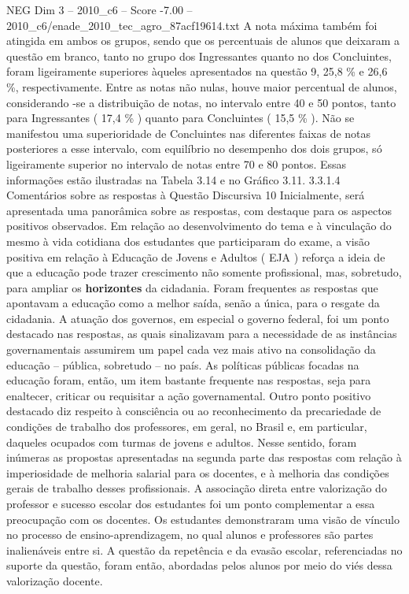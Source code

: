 \begin{textsample}{NEG Dim 3 – 2010\_c6 – Score -7.00 – 2010\_c6/enade\_2010\_tec\_agro\_87acf19614.txt}
A nota máxima também foi atingida em ambos os grupos, sendo que os percentuais de alunos que deixaram a questão em branco, tanto no grupo dos Ingressantes quanto no dos Concluintes, foram ligeiramente superiores àqueles apresentados na questão 9, 25,8 \% e 26,6 \%, respectivamente.
Entre as notas não nulas, houve maior percentual de alunos, considerando -se a distribuição de notas, no intervalo entre 40 e 50 pontos, tanto para Ingressantes ( 17,4 \% ) quanto para Concluintes ( 15,5 \% ).
Não se manifestou uma superioridade de Concluintes nas diferentes faixas de notas posteriores a esse intervalo, com equilíbrio no desempenho dos dois grupos, só ligeiramente superior no intervalo de notas entre 70 e 80 pontos.
Essas informações estão ilustradas na Tabela 3.14 e no Gráfico 3.11. 3.3.1.4 Comentários sobre as respostas à Questão Discursiva 10 Inicialmente, será apresentada uma panorâmica sobre as respostas, com destaque para os aspectos positivos observados.
Em relação ao desenvolvimento do tema e à vinculação do mesmo à vida cotidiana dos estudantes que participaram do exame, a visão positiva em relação à Educação de Jovens e Adultos ( EJA ) reforça a ideia de que a educação pode trazer crescimento não somente profissional, mas, sobretudo, para ampliar os \textbf{horizontes} da cidadania.
Foram frequentes as respostas que apontavam a educação como a melhor saída, senão a única, para o resgate da cidadania.
A atuação dos governos, em especial o governo federal, foi um ponto destacado nas respostas, as quais sinalizavam para a necessidade de as instâncias governamentais assumirem um papel cada vez mais ativo na consolidação da educação – pública, sobretudo – no país.
As políticas públicas focadas na educação foram, então, um item bastante frequente nas respostas, seja para enaltecer, criticar ou requisitar a ação governamental.
Outro ponto positivo destacado diz respeito à consciência ou ao reconhecimento da precariedade de condições de trabalho dos professores, em geral, no Brasil e, em particular, daqueles ocupados com turmas de jovens e adultos.
Nesse sentido, foram inúmeras as propostas apresentadas na segunda parte das respostas com relação à imperiosidade de melhoria salarial para os docentes, e à melhoria das condições gerais de trabalho desses profissionais.
A associação direta entre valorização do professor e sucesso escolar dos estudantes foi um ponto complementar a essa preocupação com os docentes.
Os estudantes demonstraram uma visão de vínculo no processo de ensino-aprendizagem, no qual alunos e professores são partes inalienáveis entre si.
A questão da repetência e da evasão escolar, referenciadas no suporte da questão, foram então, abordadas pelos alunos por meio do viés dessa valorização docente.

\end{textsample}

